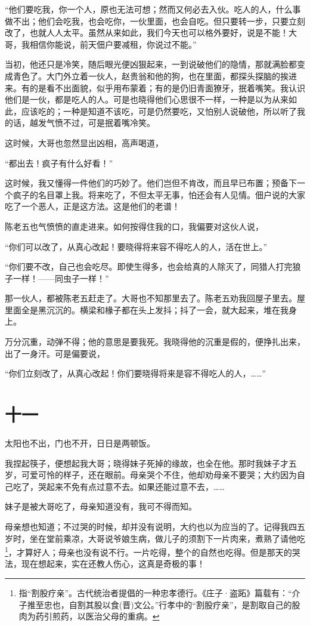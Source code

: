 \documentclass[12pt,UTF8]{ctexbook}
\begin{document}
“他们要吃我，你一个人，原也无法可想；然而又何必去入伙。吃人的人，什么事做不出；他们会吃我，也会吃你，一伙里面，也会自吃。但只要转一步，只要立刻改了，也就人人太平。虽然从来如此，我们今天也可以格外要好，说是不能！大哥，我相信你能说，前天佃户要减租，你说过不能。”

当初，他还只是冷笑，随后眼光便凶狠起来，一到说破他们的隐情，那就满脸都变成青色了。大门外立着一伙人，赵贵翁和他的狗，也在里面，都探头探脑的挨进来。有的是看不出面貌，似乎用布蒙着；有的是仍旧青面獠牙，抿着嘴笑。我认识他们是一伙，都是吃人的人。可是也晓得他们心思很不一样，一种是以为从来如此，应该吃的；一种是知道不该吃，可是仍然要吃，又怕别人说破他，所以听了我的话，越发气愤不过，可是抿着嘴冷笑。

这时候，大哥也忽然显出凶相，高声喝道，

“都出去！疯子有什么好看！”

这时候，我又懂得一件他们的巧妙了。他们岂但不肯改，而且早已布置；预备下一个疯子的名目罩上我。将来吃了，不但太平无事，怕还会有人见情。佃户说的大家吃了一个恶人，正是这方法。这是他们的老谱！

陈老五也气愤愤的直走进来。如何按得住我的口，我偏要对这伙人说，

“你们可以改了，从真心改起！要晓得将来容不得吃人的人，活在世上。”

“你们要不改，自己也会吃尽。即使生得多，也会给真的人除灭了，同猎人打完狼子一样！——同虫子一样！”

那一伙人，都被陈老五赶走了。大哥也不知那里去了。陈老五劝我回屋子里去。屋里面全是黑沉沉的。横梁和椽子都在头上发抖；抖了一会，就大起来，堆在我身上。

万分沉重，动弹不得；他的意思是要我死。我晓得他的沉重是假的，便挣扎出来，出了一身汗。可是偏要说，

“你们立刻改了，从真心改起！你们要晓得将来是容不得吃人的人，……”

\section{十一}

太阳也不出，门也不开，日日是两顿饭。

我捏起筷子，便想起我大哥；晓得妹子死掉的缘故，也全在他。那时我妹子才五岁，可爱可怜的样子，还在眼前。母亲哭个不住，他却劝母亲不要哭；大约因为自己吃了，哭起来不免有点过意不去。如果还能过意不去，……

妹子是被大哥吃了，母亲知道没有，我可不得而知。

母亲想也知道；不过哭的时候，却并没有说明，大约也以为应当的了。记得我四五岁时，坐在堂前乘凉，大哥说爷娘生病，做儿子的须割下一片肉来，煮熟了请他吃\footnote{指“割股疗亲”。古代统治者提倡的一种忠孝德行。《庄子·盗跖》篇载有：“介子推至忠也，自割其股以食(晋)文公。”行孝中的“割股疗亲”，是割取自己的股肉为药引煎药，以医治父母的重病。}，才算好人；母亲也没有说不行。一片吃得，整个的自然也吃得。但是那天的哭法，现在想起来，实在还教人伤心，这真是奇极的事！
\end{document}
